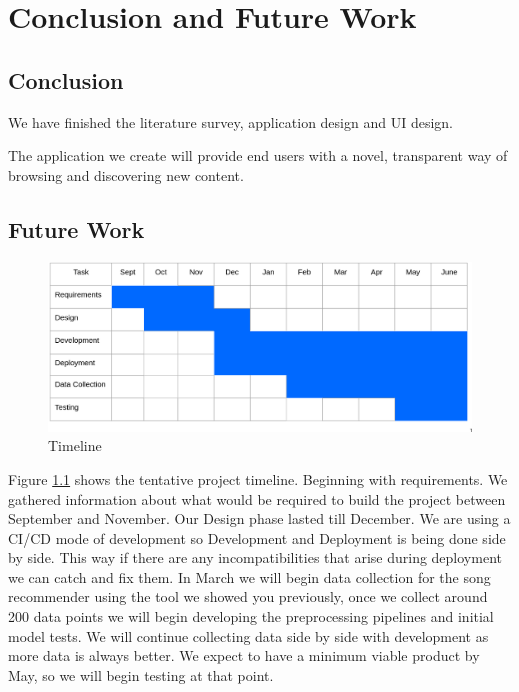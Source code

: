 \documentclass[12pt]{report} %
\begin{document}




\chapter{Conclusion and Future Work}
\section{Conclusion}
We have finished the literature survey, application design and UI design. \newline

The application we create will provide end users with a novel, transparent way of browsing and discovering new content.

\section{Future Work}
\begin{figure}[H]
\centering
\includegraphics[width=\textwidth]{imgs/timeline.png}
\caption{Timeline}
\label{fig: timeline}
\end{figure}
Figure \ref{fig: timeline} shows the tentative project timeline. Beginning with requirements. We gathered information about what would be required to build the project between September and November. Our Design phase lasted till December.\newline
We are using a CI/CD mode of development so Development and Deployment is being done side by side. This way if there are any incompatibilities  that arise during deployment we can catch and fix them.\newline
In March we will begin data collection for the song recommender using the tool we showed you previously, once we collect around 200 data points we will begin developing the preprocessing pipelines and initial model tests. We will continue collecting data side by side with development as more data is always better.
We expect to have a minimum viable product by May, so we will begin testing at that point.


\printbibliography
\end{document}
